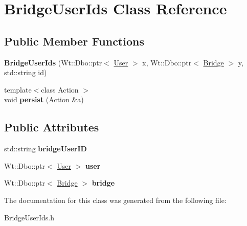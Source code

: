\hypertarget{classBridgeUserIds}{}\section{Bridge\+User\+Ids Class Reference}
\label{classBridgeUserIds}
\subsection*{Public Member Functions}
\begin{DoxyCompactItemize}
\item 
{\bfseries Bridge\+User\+Ids} (Wt\+::\+Dbo\+::ptr$<$ \hyperlink{classUser}{User} $>$ x, Wt\+::\+Dbo\+::ptr$<$ \hyperlink{classBridge}{Bridge} $>$ y, std\+::string id)\hypertarget{classBridgeUserIds_ae493577d89b03fa58a2218ec0eee466b}{}\label{classBridgeUserIds_ae493577d89b03fa58a2218ec0eee466b}

\item 
{\footnotesize template$<$class Action $>$ }\\void {\bfseries persist} (Action \&a)\hypertarget{classBridgeUserIds_a8b4bf329ea12c999cca1775ef9d981cc}{}\label{classBridgeUserIds_a8b4bf329ea12c999cca1775ef9d981cc}

\end{DoxyCompactItemize}
\subsection*{Public Attributes}
\begin{DoxyCompactItemize}
\item 
std\+::string {\bfseries bridge\+User\+ID}\hypertarget{classBridgeUserIds_ae44d7688638178ed7ba299ca9687cbb5}{}\label{classBridgeUserIds_ae44d7688638178ed7ba299ca9687cbb5}

\item 
Wt\+::\+Dbo\+::ptr$<$ \hyperlink{classUser}{User} $>$ {\bfseries user}\hypertarget{classBridgeUserIds_ab8cf148abfa077eb56c62576386dcffc}{}\label{classBridgeUserIds_ab8cf148abfa077eb56c62576386dcffc}

\item 
Wt\+::\+Dbo\+::ptr$<$ \hyperlink{classBridge}{Bridge} $>$ {\bfseries bridge}\hypertarget{classBridgeUserIds_acc206990c5f8a7faa8aa5d90c202b31a}{}\label{classBridgeUserIds_acc206990c5f8a7faa8aa5d90c202b31a}

\end{DoxyCompactItemize}


The documentation for this class was generated from the following file\+:\begin{DoxyCompactItemize}
\item 
Bridge\+User\+Ids.\+h\end{DoxyCompactItemize}
